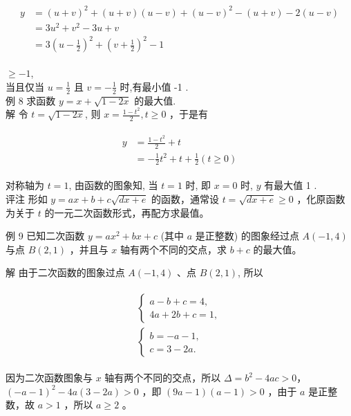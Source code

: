 \documentclass[10pt]{article}
\begin{document}
\begin{align*}
\begin{aligned}
y & =(u+v)^{2}+(u+v)(u-v)+(u-v)^{2}-(u+v)-2(u-v) \\
& =3 u^{2}+v^{2}-3 u+v \\
& =3\left(u-\frac{1}{2}\right)^{2}+\left(v+\frac{1}{2}\right)^{2}-1
\end{aligned}
\end{align*}

$\geqslant-1$,\\
当且仅当 $u=\frac{1}{2}$ 且 $v=-\frac{1}{2}$ 时,有最小值 -1 .\\
例 8 求函数 $y=x+\sqrt{1-2 x}$ 的最大值.\\
解 令 $t=\sqrt{1-2 x}$, 则 $x=\frac{1-t^{2}}{2}, t \geqslant 0$ ，于是有

\begin{align*}
\begin{aligned}
y & =\frac{1-t^{2}}{2}+t \\
& =-\frac{1}{2} t^{2}+t+\frac{1}{2}(t \geqslant 0)
\end{aligned}
\end{align*}

对称轴为 $t=1$, 由函数的图象知, 当 $t=1$ 时, 即 $x=0$ 时, $y$ 有最大值 1 .\\
评注 形如 $y=a x+b+c \sqrt{d x+e}$ 的函数，通常设 $t=\sqrt{d x+e} \geqslant 0$ ，化原函数为关于 $t$ 的一元二次函数形式，再配方求最值。

例 9 已知二次函数 $y=a x^{2}+b x+c$ (其中 $a$ 是正整数) 的图象经过点 $A(-1,4)$ 与点 $B(2,1)$ ，并且与 $x$ 轴有两个不同的交点，求 $b+c$ 的最大值。

解 由于二次函数的图象过点 $A(-1,4)$ 、点 $B(2,1)$, 所以

\begin{align*}
\begin{gathered}
\left\{\begin{array}{l}
a-b+c=4, \\
4 a+2 b+c=1,
\end{array}\right. \\
\left\{\begin{array}{l}
b=-a-1, \\
c=3-2 a .
\end{array}\right.
\end{gathered}
\end{align*}

因为二次函数图象与 $x$ 轴有两个不同的交点，所以 $\Delta=b^{2}-4 a c>0 ，$ $(-a-1)^{2}-4 a(3-2 a)>0$ ，即 $(9 a-1)(a-1)>0$ ，由于 $a$ 是正整数，故 $a>1$ ，所以 $a \geqslant 2$ 。
\end{document}
